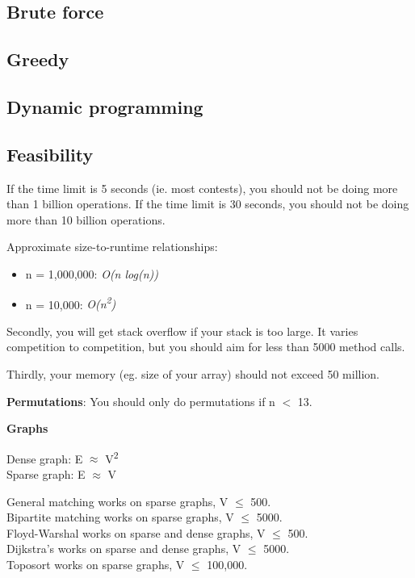 
\subsection*{Brute force}

\subsection*{Greedy}

\subsection*{Dynamic programming}

\subsection*{Feasibility}

If the time limit is 5 seconds (ie. most contests), you should not be doing more than 1 billion operations. If the time limit is 30 seconds, you should not be doing more than 10 billion operations.

Approximate size-to-runtime relationships:
\begin{itemize}
    \item n = 1,000,000: \textit{O(n log(n))}
    \item n = 10,000: \textit{O(n\textsuperscript{2})}
\end{itemize}

Secondly, you will get stack overflow if your stack is too large. It varies competition to competition, but you should aim for less than 5000 method calls.

Thirdly, your memory (eg. size of your array) should not exceed 50 million.

\textbf{Permutations}: You should only do permutations if n $<$ 13.

\textbf{Graphs}

Dense graph: E $\approx$ V\textsuperscript{2} \\
Sparse graph: E $\approx$ V

General matching works on sparse graphs, V $\leq$ 500. \\
Bipartite matching works on sparse graphs, V $\leq$ 5000. \\
Floyd-Warshal works on sparse and dense graphs, V $\leq$ 500. \\
Dijkstra’s works on sparse and dense graphs, V $\leq$ 5000. \\
Toposort works on sparse graphs, V $\leq$ 100,000.

